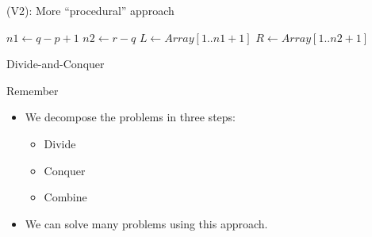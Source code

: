 \documentclass{beamer}
\begin{document}
\begin{frame}
\begin{block}{(V2): More ``procedural'' approach}
\begin{scriptsize}
    \begin{algorithmic}
       \State $n1 \gets q - p + 1$
       \State $n2 \gets r - q$  
       \State $L \gets Array[1 .. n1+1]$
       \State $R \gets Array[1 .. n2+1]$

       \EndFor
           
       \EndFor

       


         \Else
         \EndIf
       \EndFor
    \EndProcedure
    \end{algorithmic}
\end{scriptsize}
\end{block}
\end{frame}

\begin{frame}{Divide-and-Conquer}
  \begin{block}{Remember}
  \begin{itemize}  
  \item We decompose the problems in three steps:
        \begin{itemize}
        \item Divide
        \item Conquer
        \item Combine  
        \end{itemize}
      \item We can solve many problems using this approach.
  \end{itemize}      
  \end{block}
\end{frame}
\end{document}
